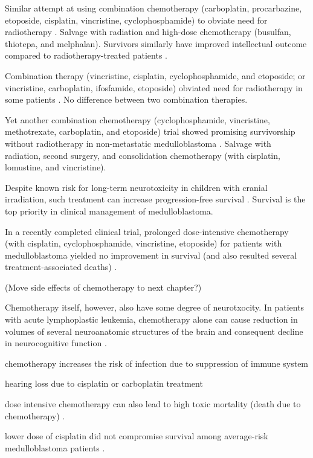 Similar attempt at using combination chemotherapy (carboplatin, procarbazine, etoposide, cisplatin, vincristine, cyclophosphamide) to obviate need for radiotherapy . Salvage with radiation and high-dose chemotherapy (busulfan, thiotepa, and melphalan). Survivors similarly have improved intellectual outcome compared to radiotherapy-treated patients .

Combination therapy (vincristine, cisplatin, cyclophosphamide, and etoposide; or vincristine, carboplatin, ifosfamide, etoposide) obviated need for radiotherapy in some patients . No difference between two combination therapies.

Yet another combination chemotherapy (cyclophosphamide, vincristine, methotrexate, carboplatin, and etoposide) trial showed promising survivorship without radiotherapy in non-metastatic medulloblastoma . Salvage with radiation, second surgery, and consolidation chemotherapy (with cisplatin, lomustine, and vincristine).

Despite known risk for long-term neurotoxicity in children with cranial irradiation, such treatment can increase progression-free survival . Survival is the top priority in clinical management of medulloblastoma.

In a recently completed clinical trial, prolonged dose-intensive chemotherapy (with cisplatin, cyclophosphamide, vincristine, etoposide) for patients with medulloblastoma yielded no improvement in survival (and also resulted several treatment-associated deaths) .

(Move side effects of chemotherapy to next chapter?)

Chemotherapy itself, however, also have some degree of neurotxocity. In patients with acute lymphoplastic leukemia, chemotherapy alone can cause reduction in volumes of several neuroanatomic structures of the brain and consequent decline in neurocognitive function .

chemotherapy increases the risk of infection due to suppression of immune system

hearing loss due to cisplatin or carboplatin treatment 

dose intensive chemotherapy can also lead to high toxic mortality (death due to chemotherapy) .

lower dose of cisplatin did not compromise survival among average-risk medulloblastoma patients .

